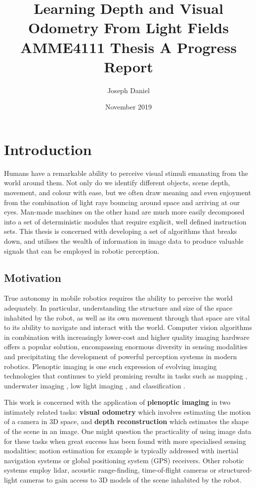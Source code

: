 \documentclass[openany]{book}
\title{Learning Depth and Visual Odometry From Light Fields \\
\large AMME4111 Thesis A Progress Report}
\author{Joseph Daniel}
\date{November 2019}
\begin{document}
\maketitle

\tableofcontents

\chapter{Introduction}
Humans have a remarkable ability to perceive visual stimuli emanating from the world around them. Not only do we identify different objects, scene depth, movement, and colour with ease, but we often draw meaning and even enjoyment from the combination of light rays bouncing around space and arriving at our eyes. Man-made machines on the other hand are much more easily decomposed into a set of deterministic modules that require explicit, well defined instruction sets. This thesis is concerned with developing a set of algorithms that breaks down, and utilises the wealth of information in image data to produce valuable signals that can be employed in robotic perception. 

\section{Motivation}
True autonomy in mobile robotics requires the ability to perceive the world adequately. In particular, understanding the structure and size of the space inhabited by the robot, as well as its own movement through that space are vital to its ability to navigate and interact with the world. Computer vision algorithms in combination with increasingly lower-cost and higher quality imaging hardware offers a popular solution, encompassing enormous diversity in sensing modalities and precipitating the development of powerful perception systems in modern robotics. Plenoptic imaging is one such expression of evolving imaging technologies that continues to yield promising results in tasks such as mapping \cite{kuehefuss2016rgbdslam}, underwater imaging \cite{skinner2016underwaterplenoptic}, low light imaging \cite{dansereau2015volumetric}, and classification \cite{wang2016lfcnn}.

This work is concerned with the application of \textbf{plenoptic imaging} in two intimately related tasks: \textbf{visual odometry} which involves estimating the motion of a camera in 3D space, and \textbf{depth reconstruction} which estimates the shape of the scene in an image. One might question the practicality of using image data for these tasks when great success has been found with more specialised sensing modalities; motion estimation for example is typically addressed with inertial navigation systems or global positioning system (GPS) receivers. Other robotic systems employ lidar, acoustic range-finding, time-of-flight cameras or structured-light cameras to gain access to 3D models of the scene inhabited by the robot. 
\end{document}
